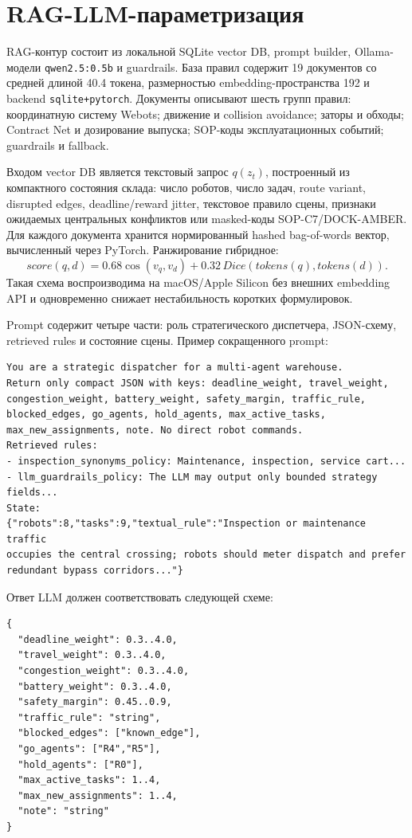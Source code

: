 \documentclass[runningheads]{llncs}
\begin{document}
\section{RAG-LLM-параметризация}

RAG-контур состоит из локальной SQLite vector DB, prompt builder, Ollama-модели \texttt{qwen2.5:0.5b} и guardrails. База правил содержит 19 документов со средней длиной 40.4 токена, размерностью embedding-пространства 192 и backend \texttt{sqlite+pytorch}. Документы описывают шесть групп правил: координатную систему Webots; движение и collision avoidance; заторы и обходы; Contract Net и дозирование выпуска; SOP-коды эксплуатационных событий; guardrails и fallback.

Входом vector DB является текстовый запрос $q(z_t)$, построенный из компактного состояния склада: число роботов, число задач, route variant, disrupted edges, deadline/reward jitter, текстовое правило сцены, признаки ожидаемых центральных конфликтов или masked-коды SOP-C7/DOCK-AMBER. Для каждого документа хранится нормированный hashed bag-of-words вектор, вычисленный через PyTorch. Ранжирование гибридное:
\[
score(q,d)=0.68\cos(v_q,v_d)+0.32\,Dice(tokens(q),tokens(d)).
\]
Такая схема воспроизводима на macOS/Apple Silicon без внешних embedding API и одновременно снижает нестабильность коротких формулировок.

Prompt содержит четыре части: роль стратегического диспетчера, JSON-схему, retrieved rules и состояние сцены. Пример сокращенного prompt:
\begin{verbatim}
You are a strategic dispatcher for a multi-agent warehouse.
Return only compact JSON with keys: deadline_weight, travel_weight,
congestion_weight, battery_weight, safety_margin, traffic_rule,
blocked_edges, go_agents, hold_agents, max_active_tasks,
max_new_assignments, note. No direct robot commands.
Retrieved rules:
- inspection_synonyms_policy: Maintenance, inspection, service cart...
- llm_guardrails_policy: The LLM may output only bounded strategy fields...
State:
{"robots":8,"tasks":9,"textual_rule":"Inspection or maintenance traffic
occupies the central crossing; robots should meter dispatch and prefer
redundant bypass corridors..."}
\end{verbatim}

Ответ LLM должен соответствовать следующей схеме:
\begin{verbatim}
{
  "deadline_weight": 0.3..4.0,
  "travel_weight": 0.3..4.0,
  "congestion_weight": 0.3..4.0,
  "battery_weight": 0.3..4.0,
  "safety_margin": 0.45..0.9,
  "traffic_rule": "string",
  "blocked_edges": ["known_edge"],
  "go_agents": ["R4","R5"],
  "hold_agents": ["R0"],
  "max_active_tasks": 1..4,
  "max_new_assignments": 1..4,
  "note": "string"
}
\end{verbatim}
\end{document}
